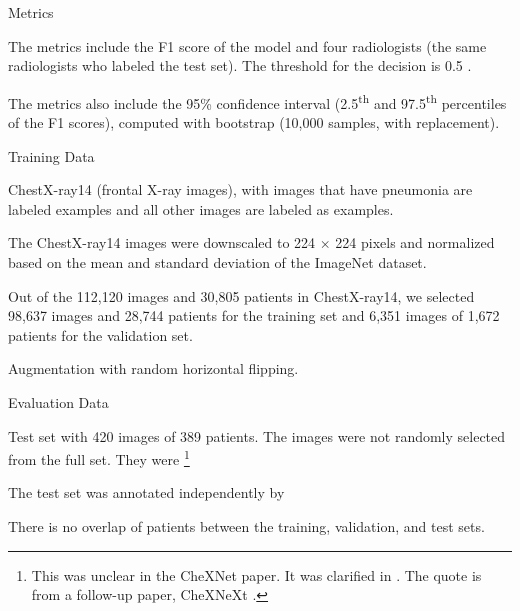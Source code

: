 \documentclass{article}
\begin{document}
\begin{adjustwidth}{-60pt}{-30pt}
\begin{singlespace}
\begin{tcolorbox}[title=\textbf{Model Card - CheXNet},
    breakable, sharp corners, boxrule=0.7pt]
{\begin{mcsection}{Metrics}
    \item The metrics include the F1 score of the model and four radiologists (the same radiologists who labeled the test set). The threshold for the decision is 0.5 \cite{OakdenRayner2018a}.
    \item The metrics also include the 95\% confidence interval (2.5\textsuperscript{th} and 97.5\textsuperscript{th} percentiles of the F1 scores), computed with bootstrap (10,000 samples, with replacement).
    \item {} \cite{Rajpurkar2017}
\end{mcsection}

\begin{mcsection}{Training Data}
    \item ChestX-ray14 (frontal X-ray images), with images that have pneumonia are labeled  examples and all other images are labeled as  examples.
    \item The ChestX-ray14 images were downscaled to 224 $\times$ 224 pixels and normalized based on the mean and standard deviation of the ImageNet dataset.
    \item Out of the 112,120 images and 30,805 patients in ChestX-ray14, we selected 98,637 images and 28,744 patients for the training set and 6,351 images of 1,672 patients for the validation set.
    \item Augmentation with random horizontal flipping.
\end{mcsection}

\begin{mcsection}{Evaluation Data}
    \item Test set with 420 images of 389 patients. The images were not randomly selected from the full set. They were  \cite{Rajpurkar2018} \footnote{This was unclear in the CheXNet paper. It was clarified in \cite{OakdenRayner2018a}. The quote is from a follow-up paper, CheXNeXt \cite{Rajpurkar2018}.}
    \item The test set was annotated independently by  \cite{Rajpurkar2017}
    \item There is no overlap of patients between the training, validation, and test sets.
\end{mcsection}

}
\end{tcolorbox}
\end{singlespace}
\end{adjustwidth}
\end{document}
